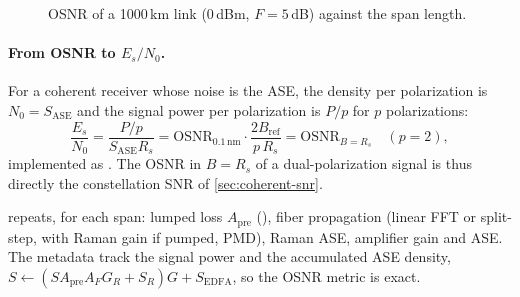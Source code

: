 \begin{figure}[htbp]
\centering
{}
\caption{OSNR of a 1000\,km link (0\,dBm, $F=5$\,dB) against the span length.}
\label{fig:osnr-span-length}
\end{figure}

\paragraph{From OSNR to $E_s/N_0$.} For a coherent receiver whose noise is the ASE, the density per
polarization is $N_0=S_{\mathrm{ASE}}$ and the signal power per polarization is $P/p$ for $p$ polarizations:
\begin{equation}
  \frac{E_s}{N_0}=\frac{P/p}{S_{\mathrm{ASE}}R_s}=\mathrm{OSNR}_{0.1\,\mathrm{nm}}\cdot\frac{2B_{\mathrm{ref}}}{p\,R_s}
  =\mathrm{OSNR}_{B=R_s}\quad(p=2),
\end{equation}
implemented as . The OSNR in $B=R_s$ of a dual-polarization signal is thus
directly the constellation SNR of \cref{sec:coherent-snr}.

\begin{incode}
 repeats, for each span: lumped loss $A_{\mathrm{pre}}$ (), fiber
propagation (linear FFT or split-step, with Raman gain if pumped, PMD), Raman ASE, amplifier gain
and ASE. The metadata track the signal power and the accumulated ASE density,
$S\leftarrow(SA_{\mathrm{pre}}A_FG_R+S_R)G+S_{\mathrm{EDFA}}$, so the OSNR metric is exact.
\end{incode}

